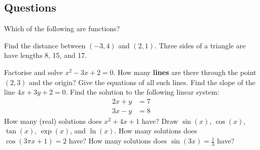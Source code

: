 \subsection*{Questions}
\begin{questions}
  \question Which of the following are functions?
  \question Find the distance between $ (-3, 4) $ and $ (2, 1) $.
  \question Three sides of a triangle are have lengths 8, 15, and 17.
  \question Factorise and solve $ x^2 - 3x + 2 = 0 $.
  \question How many \textbf{lines} are there through the point $ (2,3) $ and the origin? Give the equations of all such lines.
  \question Find the slope of the line $ 4x + 3y + 2 = 0 $.
  \question Find the solution to the following linear system:
            \begin{align*}
              2x + y &= 7\\
              3x - y &= 8
            \end{align*}
  \question How many (real) solutions does $ x^2 + 4x + 1 $ have?
  \question Draw $ \sin(x) $, $ \cos(x) $, $ \tan(x) $, $ \exp(x) $, and $ \ln(x) $.
  \question How many solutions does $ \cos (3\pi x + 1) = 2 $ have?
  \question How many solutions does $ \sin (3x) = \frac{1}{3} $ have?
\end{questions}


